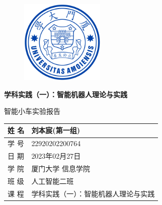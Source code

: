 \documentclass[a4paper,twoside]{article}
\title{\PaperTitle}
\author{\StudentName}
\date{\Date}
\newcommand{\StudentNumber}{22920202200764}  %
\newcommand{\StudentName}{刘本宸}  %
\newcommand{\PaperTitle}{智能小车实验报告}  %
\newcommand{\PaperType}{学科实践（一）：智能机器人理论与实践} %
\newcommand{\Date}{2023年02月27日}
\newcommand{\College}{厦门大学 信息学院}
\newcommand{\Class}{人工智能二班}
\newcommand{\CourseName}{学科实践（一）：智能机器人理论与实践}
\begin{document}
\makeatletter %
\renewcommand*\maketitle{%
	\begin{center}
		\bfseries  %
		{\LARGE \@title \par}  %
		\vskip 1em  %
			{\global\let\author\@empty}  %
			{\global\let\date\@empty}  %
		\thispagestyle{empty}   %
	\end{center}%
	\setcounter{footnote}{0}%
}
\makeatother

\thispagestyle{empty}

\vspace*{1cm}

\begin{figure}[h]
	\centering
	\includegraphics[width=4.0cm]{logo.png}
\end{figure}

\vspace*{1cm}

\begin{center}
	\Huge{\textbf{\PaperType}}

	\Large{\PaperTitle}
\end{center}

\begin{table}[h]
	\centering
	\begin{Large}
		\renewcommand{\arraystretch}{1.5}
		\begin{tabular}{p{3cm} p{5cm}<{\centering}}
			姓 \quad 名 & \StudentName (第一组) \\
			\hline
			学 \quad 号 & \StudentNumber        \\
			\hline
			日 \quad 期 & \Date                 \\
			\hline
			学 \quad 院 & \College              \\
			\hline
			班 \quad 级 & \Class                \\
			\hline
			课 \quad 程 & \CourseName           \\
			\hline
		\end{tabular}
	\end{Large}
\end{table}
\newpage
\tableofcontents
\newpage
\end{document}
